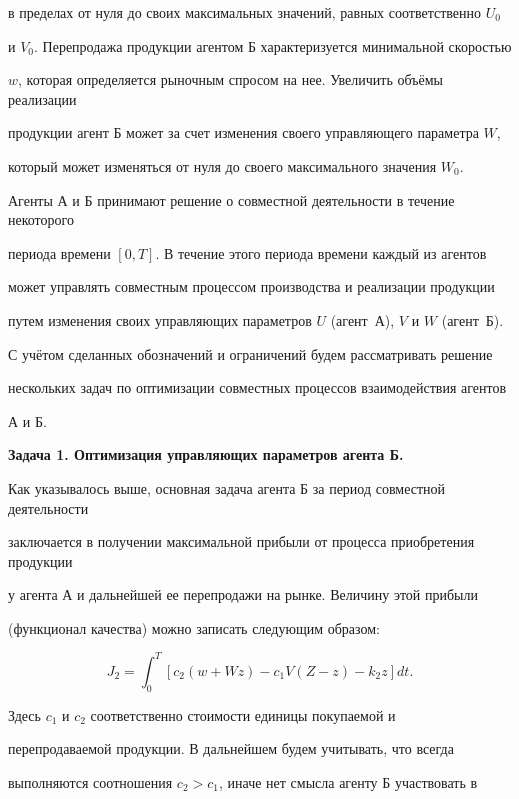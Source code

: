 в пределах от нуля до своих максимальных значений, равных соответственно $U_0$

и $V_0$. Перепродажа продукции агентом Б характеризуется минимальной скоростью

$w$, которая определяется рыночным спросом на нее. Увеличить объёмы реализации

продукции агент Б может за счет изменения своего управляющего параметра $W$,

который может изменяться от нуля до своего максимального значения $W_0$.



Агенты А и Б принимают решение о совместной деятельности в течение некоторого

периода времени $[0,T]$. В течение этого периода времени каждый из агентов

может управлять совместным процессом производства и реализации продукции

путем изменения своих управляющих параметров $U$ (агент~А), $V$ и $W$ (агент~Б).



С учётом сделанных обозначений и ограничений будем рассматривать решение

нескольких задач по оптимизации совместных процессов взаимодействия агентов

А и Б.



{\bf Задача 1. Оптимизация управляющих параметров агента Б.}

Как указывалось выше, основная задача агента Б за период совместной деятельности

заключается в получении максимальной прибыли от процесса приобретения продукции

у агента А и дальнейшей ее перепродажи на рынке. Величину этой прибыли

(функционал качества) можно записать следующим образом:



\[

      J_2=\int_{0}^{T}[c_2(w + Wz)-c_1V(Z-z)-k_2z]dt.

\]



\noindent Здесь $c_1$ и $c_2$ соответственно стоимости единицы покупаемой и

перепродаваемой продукции. В дальнейшем будем учитывать, что всегда

выполняются соотношения $c_2>c_1$, иначе нет смысла агенту Б участвовать в

